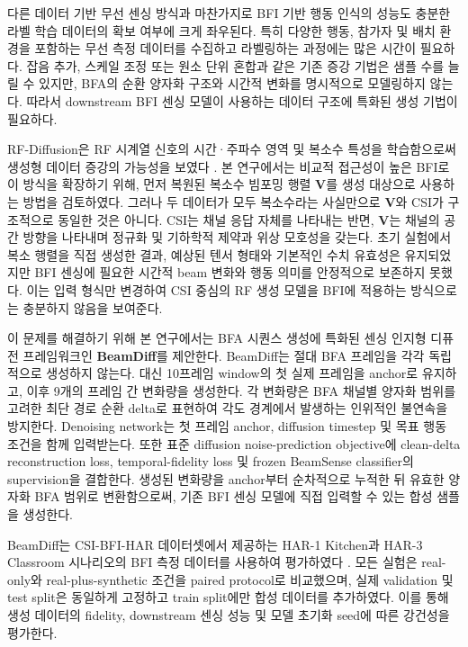 다른 데이터 기반 무선 센싱 방식과 마찬가지로 BFI 기반 행동 인식의 성능도
충분한 라벨 학습 데이터의 확보 여부에 크게 좌우된다. 특히 다양한 행동,
참가자 및 배치 환경을 포함하는 무선 측정 데이터를 수집하고 라벨링하는
과정에는 많은 시간이 필요하다. 잡음 추가, 스케일 조정 또는 원소 단위 혼합과
같은 기존 증강 기법은 샘플 수를 늘릴 수 있지만, BFA의 순환 양자화 구조와
시간적 변화를 명시적으로 모델링하지 않는다. 따라서 downstream BFI 센싱
모델이 사용하는 데이터 구조에 특화된 생성 기법이 필요하다.

RF-Diffusion은 RF 시계열 신호의 시간·주파수 영역 및 복소수 특성을
학습함으로써 생성형 데이터 증강의 가능성을 보였다 \cite{chi2024rfdiffusion}.
본 연구에서는 비교적 접근성이 높은 BFI로 이 방식을 확장하기 위해, 먼저
복원된 복소수 빔포밍 행렬 $\mathbf{V}$를 생성 대상으로 사용하는 방법을
검토하였다. 그러나 두 데이터가 모두 복소수라는 사실만으로 $\mathbf{V}$와
CSI가 구조적으로 동일한 것은 아니다. CSI는 채널 응답 자체를 나타내는 반면,
$\mathbf{V}$는 채널의 공간 방향을 나타내며 정규화 및 기하학적 제약과 위상
모호성을 갖는다. 초기 실험에서 복소 행렬을 직접 생성한 결과, 예상된 텐서
형태와 기본적인 수치 유효성은 유지되었지만 BFI 센싱에 필요한 시간적 beam
변화와 행동 의미를 안정적으로 보존하지 못했다. 이는 입력 형식만 변경하여
CSI 중심의 RF 생성 모델을 BFI에 적용하는 방식으로는 충분하지 않음을
보여준다.

이 문제를 해결하기 위해 본 연구에서는 BFA 시퀀스 생성에 특화된 센싱 인지형
디퓨전 프레임워크인 \textbf{BeamDiff}를 제안한다. BeamDiff는 절대 BFA
프레임을 각각 독립적으로 생성하지 않는다. 대신 10프레임 window의 첫 실제
프레임을 anchor로 유지하고, 이후 9개의 프레임 간 변화량을 생성한다. 각
변화량은 BFA 채널별 양자화 범위를 고려한 최단 경로 순환 delta로 표현하여
각도 경계에서 발생하는 인위적인 불연속을 방지한다. Denoising network는
첫 프레임 anchor, diffusion timestep 및 목표 행동 조건을 함께 입력받는다.
또한 표준 diffusion noise-prediction objective에 clean-delta reconstruction
loss, temporal-fidelity loss 및 frozen BeamSense classifier의 supervision을
결합한다. 생성된 변화량을 anchor부터 순차적으로 누적한 뒤 유효한 양자화
BFA 범위로 변환함으로써, 기존 BFI 센싱 모델에 직접 입력할 수 있는 합성
샘플을 생성한다.

BeamDiff는 CSI-BFI-HAR 데이터셋에서 제공하는 HAR-1 Kitchen과 HAR-3
Classroom 시나리오의 BFI 측정 데이터를 사용하여 평가하였다
\cite{haque2026datasets}. 모든 실험은 real-only와 real-plus-synthetic
조건을 paired protocol로 비교했으며, 실제
validation 및 test split은 동일하게 고정하고 train split에만 합성 데이터를
추가하였다. 이를 통해 생성 데이터의 fidelity, downstream 센싱 성능 및 모델
초기화 seed에 따른 강건성을 평가한다.

